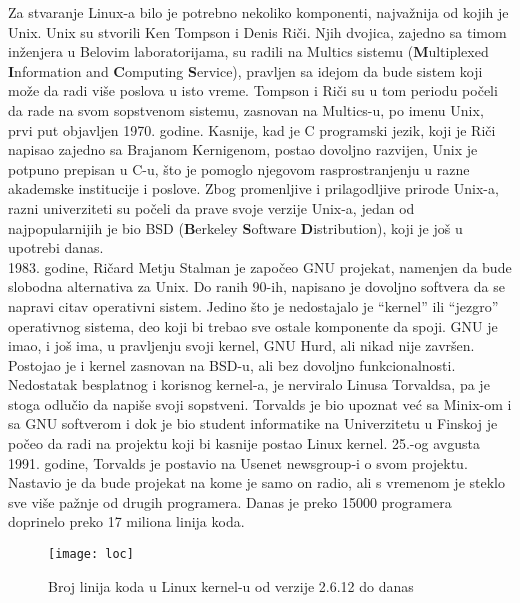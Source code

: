 \indent Za stvaranje Linux-a bilo je potrebno nekoliko komponenti, najvažnija od kojih je Unix. Unix su stvorili Ken Tompson i Denis Riči. Njih dvojica, zajedno sa timom inženjera u Belovim laboratorijama, su radili na Multics sistemu (\textbf{M}ultiplexed \textbf{I}nformation and \textbf{C}omputing \textbf{S}ervice), pravljen sa idejom da bude sistem koji može da radi više poslova u isto vreme. Tompson i Riči su u  tom periodu počeli da rade na svom sopstvenom sistemu, zasnovan na Multics-u, po imenu Unix, prvi put objavljen 1970. godine. Kasnije, kad je C programski jezik, koji je Riči napisao zajedno sa Brajanom Kernigenom, postao dovoljno razvijen, Unix je potpuno prepisan u C-u, što je pomoglo njegovom rasprostranjenju u razne akademske institucije i poslove. Zbog promenljive i prilagodljive prirode Unix-a, razni univerziteti su počeli da prave svoje verzije Unix-a, jedan od najpopularnijih je bio BSD (\textbf{B}erkeley \textbf{S}oftware \textbf{D}istribution), koji je još u upotrebi danas.\\

1983. godine, Ričard Metju Stalman je započeo GNU projekat, namenjen da bude slobodna alternativa za Unix. Do ranih 90-ih, napisano je dovoljno softvera da se napravi citav operativni sistem. Jedino što je nedostajalo je ``kernel'' ili ``jezgro'' operativnog sistema, deo koji bi trebao sve ostale komponente da spoji. GNU je imao, i još ima, u pravljenju svoji kernel, GNU Hurd, ali nikad nije završen. Postojao je i kernel zasnovan na BSD-u, ali bez dovoljno funkcionalnosti.\\

Nedostatak besplatnog i korisnog kernel-a, je nerviralo Linusa Torvaldsa, pa je stoga odlučio da napiše svoji sopstveni. Torvalds je bio upoznat već sa Minix-om i sa GNU softverom i dok je bio student informatike na Univerzitetu u Finskoj je počeo da radi na projektu koji bi kasnije postao Linux kernel. 25.-og avgusta 1991. godine, Torvalds je postavio na Usenet newsgroup-i o svom projektu. Nastavio je da bude projekat na kome je samo on radio, ali s vremenom je steklo sve više pažnje od drugih programera. Danas je preko 15000 programera  doprinelo preko 17 miliona linija koda.
\newpage
\begin{figure}[h]
	\centering
    \hspace{1cm}
\end{figure}
\begin{figure}[h]
	\centering
    \hspace{1cm}
\end{figure}
\begin{figure}[H]
	\centering
	\texttt{[image: loc]}
	\caption{Broj linija koda u Linux kernel-u od verzije 2.6.12 do danas}
\end{figure}
